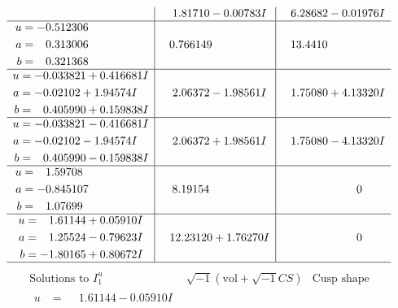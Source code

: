 \documentclass[1p]{elsarticle_modified}
\theoremstyle{definition}
\newcommand{\I}{\sqrt{-1}}
\begin{document}
$$\begin{array}{c|c|c}
 & \phantom{-}1.81710 - 0.00783 I & \phantom{-}6.28682 - 0.01976 I \\ \hline\begin{aligned}
u &= -0.512306\phantom{ +0.000000I} \\
a &= \phantom{-}0.313006\phantom{ +0.000000I} \\
b &= \phantom{-}0.321368\phantom{ +0.000000I}\end{aligned}
 & \phantom{-}0.766149\phantom{ +0.000000I} & \phantom{-}13.4410\phantom{ +0.000000I} \\ \hline\begin{aligned}
u &= -0.033821 + 0.416681 I \\
a &= -0.02102 + 1.94574 I \\
b &= \phantom{-}0.405990 + 0.159838 I\end{aligned}
 & \phantom{-}2.06372 - 1.98561 I & \phantom{-}1.75080 + 4.13320 I \\ \hline\begin{aligned}
u &= -0.033821 - 0.416681 I \\
a &= -0.02102 - 1.94574 I \\
b &= \phantom{-}0.405990 - 0.159838 I\end{aligned}
 & \phantom{-}2.06372 + 1.98561 I & \phantom{-}1.75080 - 4.13320 I \\ \hline\begin{aligned}
u &= \phantom{-}1.59708\phantom{ +0.000000I} \\
a &= -0.845107\phantom{ +0.000000I} \\
b &= \phantom{-}1.07699\phantom{ +0.000000I}\end{aligned}
 & \phantom{-}8.19154\phantom{ +0.000000I} & \phantom{-0.000000 } 0 \\ \hline\begin{aligned}
u &= \phantom{-}1.61144 + 0.05910 I \\
a &= \phantom{-}1.25524 - 0.79623 I \\
b &= -1.80165 + 0.80672 I\end{aligned}
 & \phantom{-}12.23120 + 1.76270 I & \phantom{-0.000000 } 0\\
 \hline 
 \end{array}$$\newpage$$\begin{array}{c|c|c}  
\text{Solutions to }I^u_{1}& \I (\text{vol} + \sqrt{-1}CS) & \text{Cusp shape}\\
 \hline 
\begin{aligned}
u &= \phantom{-}1.61144 - 0.05910 I \\

\end{aligned}
\end{array}$$
\end{document}

